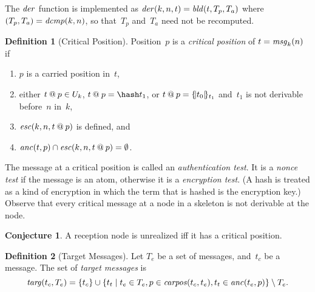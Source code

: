 \documentclass[12pt]{report}
\theoremstyle{definition}
\newtheorem{defn}{Definition}[chapter]
\newtheorem{conj}[thm]{Conjecture}
\newcommand{\msg}{\fn{msg}}
\begin{document}
The $\operatorname{\mathit{der}}$ function is implemented as
$\operatorname{\mathit{der}}(k,n,t)=\operatorname{\mathit{bld}}(t,T_p,T_a)$ where
$(T_p,T_a)=\operatorname{\mathit{dcmp}}(k,n)$, so that~$T_p$ and~$T_a$ need not be
recomputed.

\begin{defn}[Critical Position]\label{def:critical position}
Position~$p$ is a \emph{critical position} of
$t=\msg_k(n)$ if
\begin{enumerate}
\item $p$ is a carried position in~$t$,
\item either $t\mathbin{@} p\in U_k$, $t\termat p=\hash t_1$, or $t\mathbin{@}
  p=\{\!|t_0|\!\}_{t_1}$ and~$t_1$ is not derivable before~$n$ in~$k$,
  \label{item:nonce or encryption}
\item $\operatorname{\mathit{esc}}(k,n,t\mathbin{@} p)$ is defined, and
\item $\operatorname{\mathit{anc}}(t,p)\cap \operatorname{\mathit{esc}}(k,n,t\mathbin{@} p)=\emptyset$.
\end{enumerate}
\end{defn}

The message at a critical position is called an \emph{authentication
  test}.  It is a \emph{nonce test} if the message
is an atom, otherwise it is a \emph{encryption
  test}.  (A hash is treated as a kind of encryption in
which the term that is hashed is the encryption key.)  Observe that
every critical message at a node in a skeleton is not derivable at the
node.

\begin{conj}
A reception node is unrealized iff it has a critical position.
\end{conj}

\begin{defn}[Target Messages]
Let $T_e$ be a set of messages, and~$t_c$ be a message.  The set of
\emph{target messages} is
$$\operatorname{\mathit{targ}}(t_c,T_e)=\{t_c\}\cup\{t_t\mid t_e\in T_e,p\in\operatorname{\mathit{carpos}}(t_c, t_e),
t_t\in\operatorname{\mathit{anc}}(t_e,p)\}\setminus T_e.$$
\end{defn}
\end{document}
